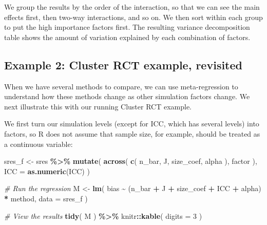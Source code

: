 \documentclass[
]{book}
\newenvironment{Shaded}{\begin{snugshade}}{\end{snugshade}}
\newcommand{\AttributeTok}[1]{\textcolor[rgb]{0.13,0.29,0.53}{#1}}
\newcommand{\CommentTok}[1]{\textcolor[rgb]{0.56,0.35,0.01}{\textit{#1}}}
\newcommand{\DecValTok}[1]{\textcolor[rgb]{0.00,0.00,0.81}{#1}}
\newcommand{\FunctionTok}[1]{\textcolor[rgb]{0.13,0.29,0.53}{\textbf{#1}}}
\newcommand{\NormalTok}[1]{#1}
\newcommand{\OtherTok}[1]{\textcolor[rgb]{0.56,0.35,0.01}{#1}}
\newcommand{\SpecialCharTok}[1]{\textcolor[rgb]{0.81,0.36,0.00}{\textbf{#1}}}
\begin{document}
We group the results by the order of the interaction, so that we can see the main effects first, then two-way interactions, and so on.
We then sort within each group to put the high importance factors first.
The resulting variance decomposition table shows the amount of variation explained by each combination of factors.

\subsection{Example 2: Cluster RCT example, revisited}\label{example-2-cluster-rct-example-revisited}

When we have several methods to compare, we can use meta-regression to understand how these methods change as other simulation factors change.
We next illustrate this with our running Cluster RCT example.

We first turn our simulation levels (except for ICC, which has several levels) into factors, so R does not assume that sample size, for example, should be treated as a continuous variable:

\begin{Shaded}
\begin{Highlighting}[]
\NormalTok{sres\_f }\OtherTok{\textless{}{-}}
\NormalTok{  sres }\SpecialCharTok{\%\textgreater{}\%}
  \FunctionTok{mutate}\NormalTok{( }
    \FunctionTok{across}\NormalTok{( }\FunctionTok{c}\NormalTok{( n\_bar, J, size\_coef, alpha ), factor ),}
    \AttributeTok{ICC =} \FunctionTok{as.numeric}\NormalTok{(ICC)}
\NormalTok{  )}

\CommentTok{\# Run the regression}
\NormalTok{M }\OtherTok{\textless{}{-}} \FunctionTok{lm}\NormalTok{( bias }\SpecialCharTok{\textasciitilde{}}\NormalTok{ (n\_bar }\SpecialCharTok{+}\NormalTok{ J }\SpecialCharTok{+}\NormalTok{ size\_coef }\SpecialCharTok{+}\NormalTok{ ICC }\SpecialCharTok{+}\NormalTok{ alpha) }\SpecialCharTok{*}\NormalTok{ method, }
         \AttributeTok{data =}\NormalTok{ sres\_f )}

\CommentTok{\# View the results}
\FunctionTok{tidy}\NormalTok{( M ) }\SpecialCharTok{\%\textgreater{}\%}
\NormalTok{  knitr}\SpecialCharTok{::}\FunctionTok{kable}\NormalTok{( }\AttributeTok{digits =} \DecValTok{3}\NormalTok{ )}
\end{Highlighting}
\end{Shaded}
\end{document}
